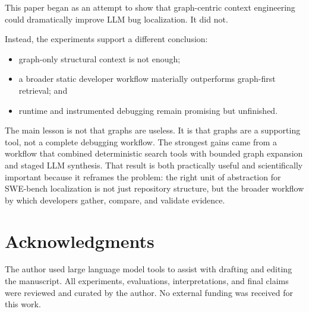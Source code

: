 \documentclass[11pt]{article}
\begin{document}
This paper began as an attempt to show that graph-centric context engineering could dramatically improve LLM bug localization. It did not.

Instead, the experiments support a different conclusion:

\begin{itemize}
\item graph-only structural context is not enough;
\item a broader static developer workflow materially outperforms graph-first retrieval; and
\item runtime and instrumented debugging remain promising but unfinished.
\end{itemize}

The main lesson is not that graphs are useless. It is that graphs are a supporting tool, not a complete debugging workflow. The strongest gains came from a workflow that combined deterministic search tools with bounded graph expansion and staged LLM synthesis. That result is both practically useful and scientifically important because it reframes the problem: the right unit of abstraction for SWE-bench localization is not just repository structure, but the broader workflow by which developers gather, compare, and validate evidence.

\section*{Acknowledgments}

The author used large language model tools to assist with drafting and editing the manuscript. All experiments, evaluations, interpretations, and final claims were reviewed and curated by the author. No external funding was received for this work.


\end{document}
